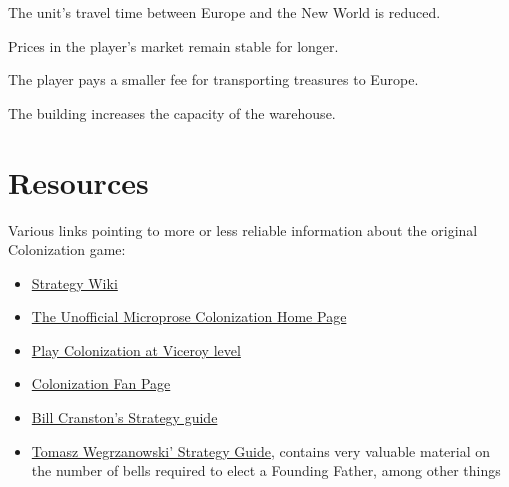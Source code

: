 \documentclass[12pt]{book}
\begin{document}
The unit's travel time between Europe and the New World is reduced.

\affectsPlayer

Prices in the player's market remain stable for longer.

\affectsPlayer

The player pays a smaller fee for transporting treasures to Europe.

\affectsBuilding

The building increases the capacity of the warehouse.


\hypertarget{Resources}{\chapter{Resources}}

Various links pointing to more or less reliable information about the
original Colonization game:

\begin{itemize}
\item \href{http://strategywiki.org/wiki/Sid_Meier%27s_Colonization}
  {Strategy Wiki}
\item \href{http://www.colonization.biz/}{The Unofficial Microprose
  Colonization Home Page}
\item \href{http://dledgard0.tripod.com/FAQs/play_col_at_viceroy.htm}
  {Play Colonization at Viceroy level}
\item \href{http://www.colonizationfans.com/}{Colonization Fan Page}
\item \href{http://www.ibiblio.org/GameBytes/issue21/misc/colstrat.html}
  {Bill Cranston's Strategy guide}
\item \href{http://civilization.wikia.com/wiki/Colonization_tips}
  {Tomasz Wegrzanowski' Strategy Guide}, contains very valuable
  material on the number of bells required to elect a Founding Father,
  among other things
\end{itemize}


\printindex
\end{document}
